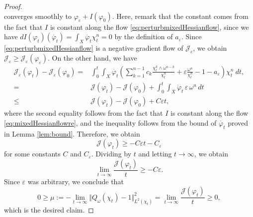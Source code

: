 \documentclass[10pt,a4paper]{amsart}
\numberwithin{equation}{section}
\begin{document}
\begin{proof}
\begin{equation}
\end{equation}
    converges smoothly to $\varphi_\varepsilon+I(\varphi_0)$. Here, remark that the constant comes from the fact that $I$ is constant along the flow \eqref{eq:perturbmixedHessianflow}, since we have
    $dI(\varphi_t)(\dot{\varphi_t})=\int_X\dot{\varphi_t}\chi_t^n=0$
    by the definition of $a_\varepsilon$.
    Since \eqref{eq:perturbmixedHessianflow} is a negative gradient flow of $\mathcal{J}_{\varepsilon}$, we obtain $\mathcal{J}_{\varepsilon}\ge\mathcal{J}_{\varepsilon}(\varphi_\varepsilon).$ 
    On the other hand, we have
    \begin{equation*}
        \begin{aligned}
            \mathcal{J}_{\varepsilon}(\varphi_t)-\mathcal{J}_{\varepsilon}(\varphi_0)
            =&\int_0^t\int_X\dot{\varphi_t}\left(\sum_{k=1}^{n-1}c_k\frac{\chi_t^k\wedge\omega^{n-k}}{\chi_t^n}+\varepsilon\frac{\omega^n}{\chi_t^n}-1-a_{\varepsilon}\right)\chi_t^n\ dt,\\
            =&\mathcal{J}(\varphi_t)-\mathcal{J}(\varphi_0)+\int_0^t\int_X\dot{\varphi}_t\, \varepsilon\, \omega^n \,dt\\
            \le&\mathcal{J}(\varphi_t)-\mathcal{J}(\varphi_0)+C\varepsilon t,
        \end{aligned}
    \end{equation*}
    where the second equality follows from the fact that $I$ is constant along the flow \eqref{eq:mixedHessianflowre}, and the inequality follows from the bound of $\dot{\varphi_t}$ proved in Lemma \ref{lem:bound}. Therefore, we obtain
    $$\mathcal{J}(\varphi_t)\ge -C\varepsilon t-C_\varepsilon$$
    for some constants $C$ and $C_\varepsilon$.
    Dividing by $t$ and letting $t\to\infty$, we obtain
    $$\lim_{t\to\infty}\frac{\mathcal{J}(\varphi_t)}{t}\ge -C\varepsilon.$$
    Since $\varepsilon$ was arbitrary, we conclude that
    $$0\ge\mu:=-\lim_{t\to\infty}\Vert Q_{\omega}(\chi_t)-1\Vert^2_{L^2(\chi_t)}=\lim_{t\to\infty}\frac{\mathcal{J}(\varphi_t)}{t}\ge0,$$
    which is the desired claim.
\end{proof}
\end{document}
